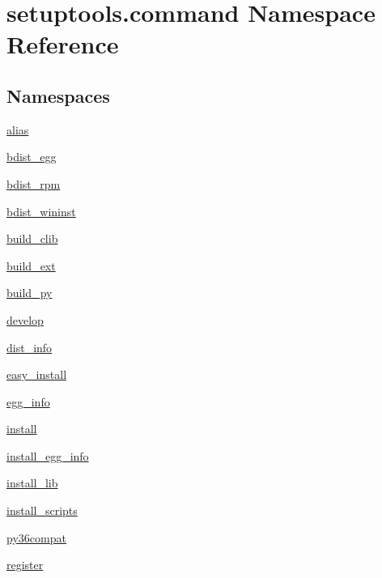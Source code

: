 \hypertarget{namespacesetuptools_1_1command}{}\section{setuptools.\+command Namespace Reference}
\label{namespacesetuptools_1_1command}
\subsection*{Namespaces}
\begin{DoxyCompactItemize}
\item 
 \hyperlink{namespacesetuptools_1_1command_1_1alias}{alias}
\item 
 \hyperlink{namespacesetuptools_1_1command_1_1bdist__egg}{bdist\+\_\+egg}
\item 
 \hyperlink{namespacesetuptools_1_1command_1_1bdist__rpm}{bdist\+\_\+rpm}
\item 
 \hyperlink{namespacesetuptools_1_1command_1_1bdist__wininst}{bdist\+\_\+wininst}
\item 
 \hyperlink{namespacesetuptools_1_1command_1_1build__clib}{build\+\_\+clib}
\item 
 \hyperlink{namespacesetuptools_1_1command_1_1build__ext}{build\+\_\+ext}
\item 
 \hyperlink{namespacesetuptools_1_1command_1_1build__py}{build\+\_\+py}
\item 
 \hyperlink{namespacesetuptools_1_1command_1_1develop}{develop}
\item 
 \hyperlink{namespacesetuptools_1_1command_1_1dist__info}{dist\+\_\+info}
\item 
 \hyperlink{namespacesetuptools_1_1command_1_1easy__install}{easy\+\_\+install}
\item 
 \hyperlink{namespacesetuptools_1_1command_1_1egg__info}{egg\+\_\+info}
\item 
 \hyperlink{namespacesetuptools_1_1command_1_1install}{install}
\item 
 \hyperlink{namespacesetuptools_1_1command_1_1install__egg__info}{install\+\_\+egg\+\_\+info}
\item 
 \hyperlink{namespacesetuptools_1_1command_1_1install__lib}{install\+\_\+lib}
\item 
 \hyperlink{namespacesetuptools_1_1command_1_1install__scripts}{install\+\_\+scripts}
\item 
 \hyperlink{namespacesetuptools_1_1command_1_1py36compat}{py36compat}
\item 
 \hyperlink{namespacesetuptools_1_1command_1_1register}{register}

\end{DoxyCompactItemize}
